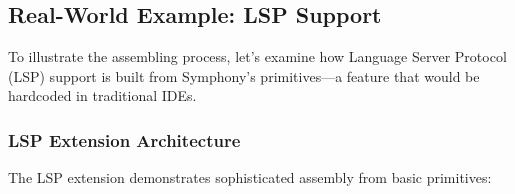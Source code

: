 \subsection*{Real-World Example: LSP Support}

To illustrate the assembling process, let's examine how Language Server Protocol (LSP) support is built from Symphony's primitives—a feature that would be hardcoded in traditional IDEs.

\subsubsection*{LSP Extension Architecture}

The LSP extension demonstrates sophisticated assembly from basic primitives:

